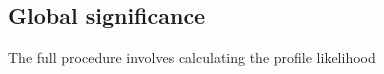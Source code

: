 \subsection{Global significance}



The full procedure involves calculating the profile likelihood




























